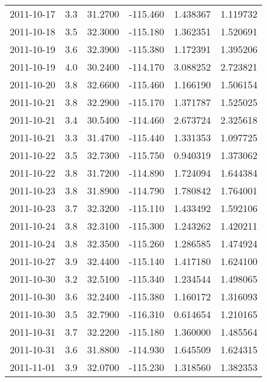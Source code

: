 \begin{tabular}{lrrrrr}
2011-10-17 &       3.3 &  31.2700 &  -115.460 &         1.438367 &         1.119732 \\
2011-10-18 &       3.5 &  32.3000 &  -115.180 &         1.362351 &         1.520691 \\
2011-10-19 &       3.6 &  32.3900 &  -115.380 &         1.172391 &         1.395206 \\
2011-10-19 &       4.0 &  30.2400 &  -114.170 &         3.088252 &         2.723821 \\
2011-10-20 &       3.8 &  32.6600 &  -115.460 &         1.166190 &         1.506154 \\
2011-10-21 &       3.8 &  32.2900 &  -115.170 &         1.371787 &         1.525025 \\
2011-10-21 &       3.4 &  30.5400 &  -114.460 &         2.673724 &         2.325618 \\
2011-10-21 &       3.3 &  31.4700 &  -115.440 &         1.331353 &         1.097725 \\
2011-10-22 &       3.5 &  32.7300 &  -115.750 &         0.940319 &         1.373062 \\
2011-10-22 &       3.8 &  31.7200 &  -114.890 &         1.724094 &         1.644384 \\
2011-10-23 &       3.8 &  31.8900 &  -114.790 &         1.780842 &         1.764001 \\
2011-10-23 &       3.7 &  32.3200 &  -115.110 &         1.433492 &         1.592106 \\
2011-10-24 &       3.8 &  32.3100 &  -115.300 &         1.243262 &         1.420211 \\
2011-10-24 &       3.8 &  32.3500 &  -115.260 &         1.286585 &         1.474924 \\
2011-10-27 &       3.9 &  32.4400 &  -115.140 &         1.417180 &         1.624100 \\
2011-10-30 &       3.2 &  32.5100 &  -115.340 &         1.234544 &         1.498065 \\
2011-10-30 &       3.6 &  32.2400 &  -115.380 &         1.160172 &         1.316093 \\
2011-10-30 &       3.5 &  32.7900 &  -116.310 &         0.614654 &         1.210165 \\
2011-10-31 &       3.7 &  32.2200 &  -115.180 &         1.360000 &         1.485564 \\
2011-10-31 &       3.6 &  31.8800 &  -114.930 &         1.645509 &         1.624315 \\
2011-11-01 &       3.9 &  32.0700 &  -115.230 &         1.318560 &         1.382353 \\

\end{tabular}
